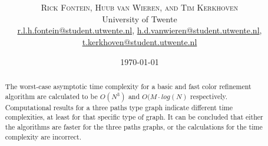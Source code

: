 \documentclass[twoside]{article}
\title{\vspace{-15mm}\fontsize{24pt}{10pt}\selectfont\textbf{\articletitle}} %
\author{
\large
\textsc{Rick Fontein, Huub van Wieren, and Tim Kerkhoven}\\[2mm] %
\normalsize University of Twente \\ %
\normalsize \href{mailto:r.l.h.fontein@student.utwente.nl}{r.l.h.fontein@student.utwente.nl},
\href{mailto:h.d.vanwieren@student.utwente.nl}{h.d.vanwieren@student.utwente.nl},\\
\normalsize \href{mailto:t.kerkhoven@student.utwente.nl}{t.kerkhoven@student.utwente.nl}%
}
\date{\today}
\begin{document}
\thispagestyle{empty}
\maketitle %


\begin{abstract}

\noindent The worst-case asymptotic time complexity for a basic and fast color refinement algorithm are calculated to be $O(N^3)$ and $O(M\cdot{}log(N)$ respectively. Computational results for a three paths type graph indicate different time complexities, at least for that specific type of graph. It can be concluded that either the algorithms are faster for the three paths graphs, or the calculations for the time complexity are incorrect.

\end{abstract}

\end{document}
